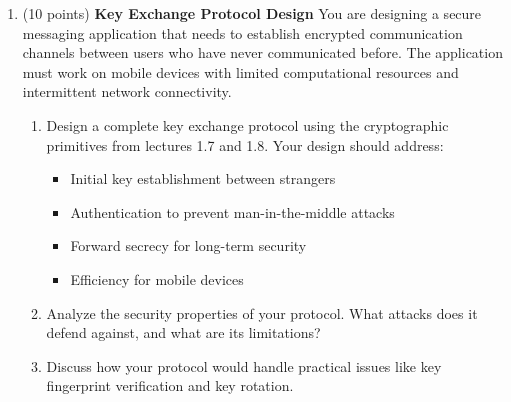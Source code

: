 \documentclass[10pt,a4paper,american]{article}
\begin{document}
\begin{enumerate}
	\item (10 points) \textbf{Key Exchange Protocol Design}
	      You are designing a secure messaging application that needs to establish encrypted communication channels between users who have never communicated before. The application must work on mobile devices with limited computational resources and intermittent network connectivity.
	      \begin{enumerate}
		      \item Design a complete key exchange protocol using the cryptographic primitives from lectures 1.7 and 1.8. Your design should address:
		            \begin{itemize}
			            \item Initial key establishment between strangers
			            \item Authentication to prevent man-in-the-middle attacks
			            \item Forward secrecy for long-term security
			            \item Efficiency for mobile devices
		            \end{itemize}
		      \item Analyze the security properties of your protocol. What attacks does it defend against, and what are its limitations?
		      \item Discuss how your protocol would handle practical issues like key fingerprint verification and key rotation.
	      \end{enumerate}


\end{enumerate}
\end{document}
